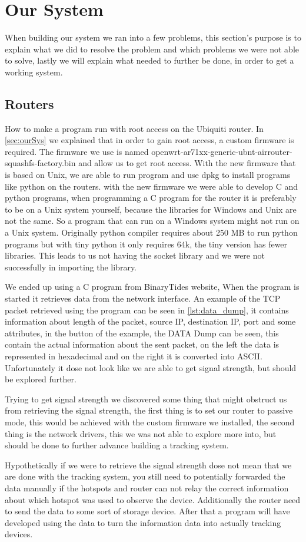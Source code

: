 \section{Our System}
When building our system we ran into a few problems, this section's purpose is to explain what we did to resolve the problem and which problems we were not able to solve, lastly we will explain what needed to further be done, in order to get a working system.

\subsection*{Routers}
How to make a program run with root access on the Ubiquiti router. In \cref{sec:ourSys} we explained that in order to gain root access, a custom firmware is required. The firmware we use is named openwrt-ar71xx-generic-ubnt-airrouter-squashfs-factory.bin and allow us to get root access. With the new firmware that is based on Unix, we are able to run program and use dpkg to install programs like python on the routers. with the new firmware we were able to develop C and python programs, when programming a C program for the router it is preferably to be on a Unix system yourself, because the libraries for Windows and Unix are not the same. So a program that can run on a Windows system might not run on a Unix system. Originally python compiler requires about 250 MB to run python programs but with tiny python it only requires 64k, the tiny version has fewer libraries. This leads to us not having the socket library and we were not successfully in importing the library.

We ended up using a C program from BinaryTides website\cite{SnifferCode}, When the program is started it retrieves data from the network interface. An example of the TCP packet retrieved using the program can be seen in \cref{lst:data_dump}, it contains information about length of the packet, source IP, destination IP, port and some attributes, in the button of the example, the DATA Dump can be seen, this contain the actual information about the sent packet, on the left the data is represented in hexadecimal and on the right it is converted into ASCII. Unfortunately it dose not look like we are able to get signal strength, but should be explored further.

Trying to get signal strength we discovered some thing that might obstruct us from retrieving the signal strength, the first thing is to set our router to passive mode, this would be achieved with the custom firmware we installed, the second thing is the network drivers, this we was not able to explore more into, but should be done to further advance building a tracking system.

Hypothetically if we were to retrieve the signal strength dose not mean that we are done with the tracking system, you still need to potentially forwarded the data manually if the hotspots and router can not relay the correct information about which hotspot was used to observe the device. Additionally the router need to send the data to some sort of storage device. After that a program will have developed using the data to turn the information data into actually tracking devices.
